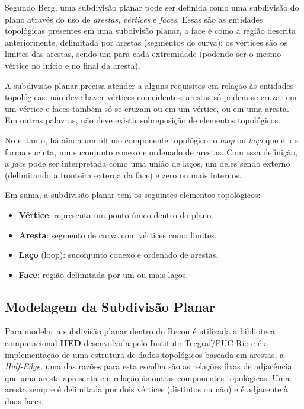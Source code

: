 Segundo Berg\cite{Berg}, uma subdivisão planar pode ser definida como uma subdivisão do plano através do uso de \textit{arestas}, \textit{vértices} e \textit{faces}. Essas são as entidades topológicas presentes em uma subdivisão planar, a face é como a região descrita anteriormente, delimitada por arestas (segmentos de curva); os vértices são os limites das arestas, sendo um para cada extremidade (podendo ser o mesmo vértice no início e no final da aresta).

A subdivisão planar precisa atender a alguns requisitos em relação às entidades topológicas: não deve haver vértices coincidentes; arestas só podem se cruzar em um vértice e faces também só se cruzam ou em um vértice, ou em uma aresta. Em outras palavras, não deve existir sobreposição de elementos topológicos. 

No entanto, há ainda um último componente topológico: o \textit{loop} ou \textit{laço} que é, de forma sucinta, um suconjunto conexo e ordenado de arestas. Com essa definição, a \textit{face} pode ser interpretada como uma união de laços, um deles sendo externo (delimitando a fronteira externa da face) e zero ou mais internos.

Em suma, a subdivisão planar tem os seguintes elementos topológicos:
\renewcommand{\labelitemi}{•}
\begin{itemize}
  \item \textbf{Vértice}: representa um ponto único dentro do plano.
  \item \textbf{Aresta}: segmento de curva com vértices como limites.
  \item \textbf{Laço} (loop): suconjunto conexo e ordenado de arestas.
  \item \textbf{Face}: região delimitada por um ou mais laços.
\end{itemize}

\subsection{Modelagem da Subdivisão Planar}

Para modelar a subdivisão planar dentro do Recon é utilizada a biblioteca computacional \textbf{HED} desenvolvida pelo Instituto Tecgraf/PUC-Rio e é a implementação de uma estrutura de dados topológicos baseada em arestas, a \textit{Half-Edge}\cite{HED}, uma das razões para esta escolha são as relações fixas de adjacência que uma aresta apresenta em relação às outras componentes topológicas. Uma aresta sempre é delimitada por dois vértices (distintos ou não) e é adjacente à duas faces.

